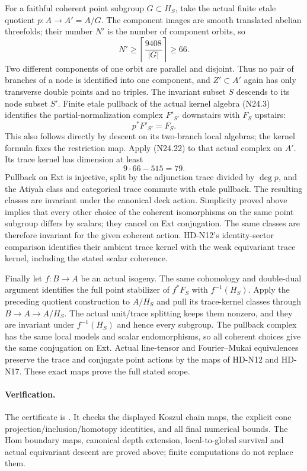 For a faithful coherent point subgroup $G\subset H_S$, take
the actual finite etale quotient $p:A\to A'=A/G$.
The component images are smooth translated abelian threefolds;
their number $N'$ is the number of component orbits, so
\[
                      N'\ge\left\lceil\frac{9408}{|G|}\right\rceil
                               \ge66.                      \tag{N24.23}
\]
Two different components of one orbit are parallel and disjoint.
Thus no pair of branches of a node is identified into one
component, and $Z'\subset A'$ again has only transverse double
points and no triples. The invariant subset $S$ descends to
its node subset $S'$. Finite etale pullback of the actual kernel
algebra (N24.3) identifies the partial-normalization complex
$F'_{S'}$ downstairs with $F_S$ upstairs:
\[
                              p^*F'_{S'}=F_S.               \tag{N24.24}
\]
This also follows directly by descent on its two-branch local
algebras; the kernel formula fixes the restriction map.
Apply (N24.22) to that actual complex on $A'$. Its trace
kernel has dimension at least
\[
                               9\cdot66-515=79.             \tag{N24.25}
\]
Pullback on Ext is injective, split by the adjunction trace
divided by $\deg p$, and the Atiyah class and categorical
trace commute with etale pullback. The resulting classes
are invariant under the canonical deck action. Simplicity
proved above implies that every other choice of the coherent
isomorphisms on the same point subgroup differs by scalars;
they cancel on Ext conjugation. The same classes are therefore
invariant for the given coherent action. HD-N12's identity-sector
comparison identifies their ambient trace kernel with the weak
equivariant trace kernel, including the stated scalar coherence.

Finally let $f:B\to A$ be an actual isogeny. The same
cohomology and double-dual argument identifies the full point
stabilizer of $f^*F_S$ with $f^{-1}(H_S)$. Apply the preceding
quotient construction to $A/H_S$ and pull its trace-kernel
classes through $B\to A\to A/H_S$. The actual unit/trace
splitting keeps them nonzero, and they are invariant under
$f^{-1}(H_S)$ and hence every subgroup. The pullback complex
has the same local models and scalar endomorphisms, so all
coherent choices give the same conjugation on Ext. Actual
line-tensor and Fourier--Mukai equivalences preserve the
trace and conjugate point actions by the maps of HD-N12 and
HD-N17. These exact maps prove the full stated scope.

\paragraph{Verification.}
The certificate is .
It checks the displayed Koszul chain maps, the explicit cone
projection/inclusion/homotopy identities, and all final numerical
bounds. The Hom boundary maps, canonical depth extension,
local-to-global survival and actual equivariant descent are
proved above; finite computations do not replace them.
